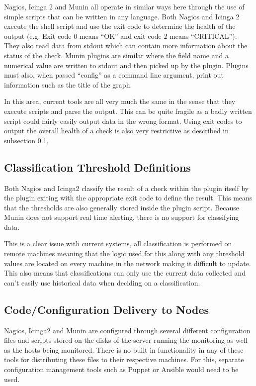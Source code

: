\documentclass[bsc,deptreport,twoside,parskip,singlespacing,notimes]{infthesis}
\begin{document}
	Nagios, Icinga 2 and Munin all operate in similar ways here through the use of
	simple scripts that can be written in any language.  Both Nagios and Icinga 2
	execute the shell script and use the exit code to determine the health of the
	output (e.g. Exit code 0 means ``OK'' and exit code 2 means ``CRITICAL'').  They
	also read data from stdout which can contain more information about the status
	of the check.  Munin plugins are similar where the field name and a numerical
	value are written to stdout and then picked up by the plugin.  Plugins must
	also, when passed ``config'' as a command line argument, print out information
	such as the title of the graph.


	In this area, current tools are all very much the same in the sense that they
	execute scripts and parse the output. This can be quite fragile as a badly
	written script could fairly easily output data in the wrong format. Using exit
	codes to output the overall health of a check is also very restrictive as
	described in subsection \ref{classification-threshold-definitions}.

\subsection{Classification Threshold Definitions}
\label{classification-threshold-definitions}

	Both Nagios and Icinga2 classify the result of a check within the plugin itself
	by the plugin exiting with the appropriate exit code to define the result. This
	means that the thresholds are also generally stored inside the plugin script.
	Because Munin does not support real time alerting, there is no support for
	classifying data.


	This is a clear issue with current systems, all classification is performed on
	remote machines meaning that the logic used for this along with any threshold
	values are located on every machine in the network making it difficult to
	update. This also means that classifications can only use the current data
	collected and can't easily use historical data when deciding on a
	classification.

\subsection{Code/Configuration Delivery to Nodes}

	Nagios, Icinga2 and Munin are configured through several different
	configuration files and scripts stored on the disks of the server running the
	monitoring as well as the hosts being monitored.  There is no built in
	functionality in any of these tools for distributing these files to their
	respective machines.  For this, separate configuration management tools such as
	Puppet or Ansible would need to be used.
\end{document}
